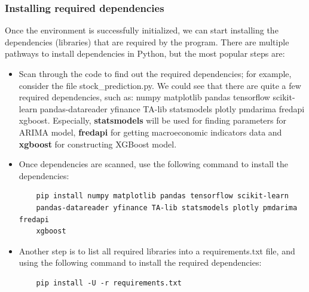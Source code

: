 \documentclass[11pt]{article}
\begin{document}
\subsubsection{Installing required dependencies}
Once the environment is successfully initialized, we can start installing the dependencies (libraries) that are required by the program. There are multiple pathways to install dependencies in Python, but the most popular steps are:

\begin{itemize}
    \item Scan through the code to find out the required dependencies; for example, consider the file stock\_prediction.py. We could see that there are quite a few required dependencies, such as: numpy matplotlib pandas tensorflow scikit-learn pandas-datareader yfinance TA-lib statsmodels plotly pmdarima fredapi xgboost. Especially, \textbf{statsmodels} will be used for finding parameters for ARIMA model, \textbf{fredapi} for getting macroeconomic indicators data and \textbf{xgboost} for constructing XGBoost model.
    \item Once dependencies are scanned, use the following command to install the dependencies:
    \begin{center}
    \begin{verbatim}
    pip install numpy matplotlib pandas tensorflow scikit-learn
    pandas-datareader yfinance TA-lib statsmodels plotly pmdarima fredapi
    xgboost
    \end{verbatim}
    \end{center}
    \item Another step is to list all required libraries into a requirements.txt file, and using the following command to install the required dependencies:
    \begin{center}
    \begin{verbatim}
    pip install -U -r requirements.txt
    \end{verbatim}
    \end{center}
\end{itemize}
\end{document}

